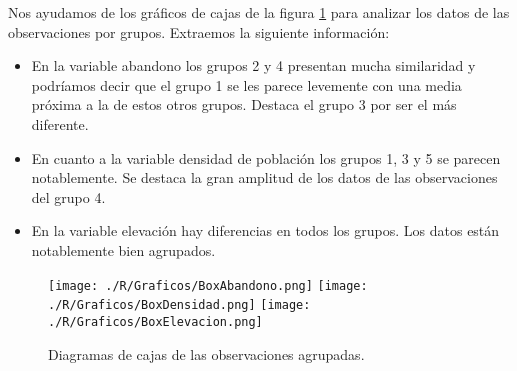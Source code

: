 \documentclass[11pt,a4paper]{article}
\begin{document}
Nos ayudamos de los gráficos de cajas de la figura \ref{fig:box} para analizar los datos de las observaciones por grupos. Extraemos la siguiente información:
\begin{itemize}
\item En la variable abandono los grupos 2 y 4 presentan mucha similaridad y podríamos decir que el grupo 1 se les parece levemente con una media próxima a la de estos otros grupos. Destaca el grupo 3 por ser el más diferente.
\item En cuanto a la variable densidad de población los grupos 1, 3 y 5 se parecen notablemente. Se destaca la gran amplitud de los datos de las observaciones del grupo 4.
\item En la variable elevación hay diferencias en todos los grupos. Los datos están notablemente bien agrupados.
\end{itemize}

\begin{figure}
\centering
\texttt{[image: ./R/Graficos/BoxAbandono.png]}
\texttt{[image: ./R/Graficos/BoxDensidad.png]}
\texttt{[image: ./R/Graficos/BoxElevacion.png]}
\caption{Diagramas de cajas de las observaciones agrupadas.}
\label{fig:box}
\end{figure}
\end{document}
